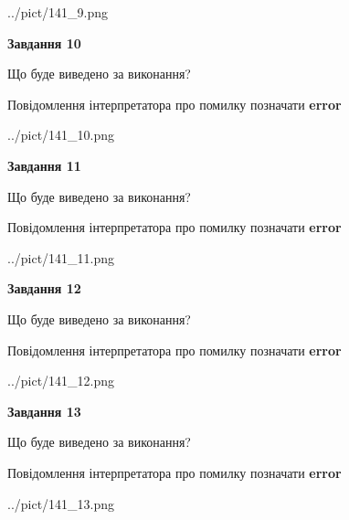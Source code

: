 \documentclass[11pt, ukrainian]{article}
\begin{document}
{\begin {large}
\begin{center}
	{../pict/141_9.png}
\end{center}
\newpage

{\begin {center}\textbf{Завдання 10}\end {center}}\par
Що буде виведено за виконання? \par
Повідомлення інтерпретатора про помилку позначати \textbf{error}

\begin{center}
	{../pict/141_10.png}
\end{center}
\newpage

{\begin {center}\textbf{Завдання 11}\end {center}}\par
Що буде виведено за виконання? \par
Повідомлення інтерпретатора про помилку позначати \textbf{error}

\begin{center}
	{../pict/141_11.png}
\end{center}
\newpage

{\begin {center}\textbf{Завдання 12}\end {center}}\par
Що буде виведено за виконання? \par
Повідомлення інтерпретатора про помилку позначати \textbf{error}

\begin{center}
	{../pict/141_12.png}
\end{center}
\newpage

{\begin {center}\textbf{Завдання 13}\end {center}}\par
Що буде виведено за виконання? \par
Повідомлення інтерпретатора про помилку позначати \textbf{error}

\begin{center}
	{../pict/141_13.png}
\end{center}
\newpage


\end{large}}
\end{document}
